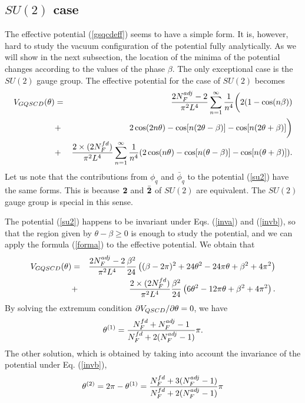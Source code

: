 \documentclass[a4paper,12pt]{article}
\begin{document}
\subsection{$SU(2)$ case}
The effective potential (\ref{gsqcdeff}) seems to have a simple form.
It is, however, hard to study the vacuum configuration of the
potential fully analytically.
As we will show in the next subsection, the location 
of the minima of the potential changes 
according to the values of the phase $\beta$. 
The only exceptional case is the $SU(2)$ gauge group.
The effective potential for the case of $SU(2)$ becomes
\begin{eqnarray}
V_{GQSCD}(\theta)&=&
{{2N_F^{adj}-2}\over {\pi^2 L^4}}\sum_{n=1}^{\infty}{1\over n^4}
\biggl(2(1-\cos(n\beta))\nonumber\\
&+&2\cos(2n\theta)-\cos[n(2\theta-\beta)]
-\cos[n(2\theta+\beta)]\biggr)\nonumber\\
&+&{{2\times (2N_F^{fd})}\over{\pi^2 L^4}}\sum_{n=1}^{\infty}{1\over n^4}
(2\cos(n\theta)-\cos[n(\theta-\beta)]-\cos[n(\theta+\beta)]).
\label{su2}
\end{eqnarray}
Let us note that the contributions from $\phi_q$ and ${\bar\phi}_q$ 
to the potential (\ref{su2}) have the same forms. This is because
${\bf 2}$ and ${\bar {\bf 2}}$ of $SU(2)$ are equivalent.
The $SU(2)$ gauge group is special in this sense.
\par
The potential (\ref{su2}) happens to be invariant under 
Eqs. (\ref{inva}) and (\ref{invb}), so that
the region given by $\theta-\beta \geq 0$ is enough to study the 
potential, and we can apply the formula (\ref{forma}) to the effective
potential. We obtain that
\begin{eqnarray}
V_{GQSCD}(\theta)&=&
{{2N_F^{adj}-2}\over {\pi^2 L^4}}{{\beta^2}\over {24}}
\left((\beta-2\pi)^2+24\theta^2
-24\pi\theta+\beta^2+4\pi^2\right)\nonumber\\
&+&{{2\times (2N_F^{fd})}\over{\pi^2 L^4}}{{\beta^2}\over{24}}
\left(6\theta^2-12\pi\theta+\beta^2+4\pi^2\right).
\end{eqnarray}
By solving the extremum condition $\partial V_{QSCD}/\partial\theta=0$, we have
\begin{equation}
\theta^{(1)}={{N_F^{fd}+N_F^{adj}-1}\over{N_F^{fd}+2(N_F^{adj}-1)}}\pi.
\label{su2sol}
\end{equation}
The other solution, which is 
obtained by taking into account the invariance of the potential 
under Eq. (\ref{invb}), 
\begin{equation}
\theta^{(2)}=2\pi-\theta^{(1)}
={{N_F^{fd}+3(N_F^{adj}-1)}\over{N_F^{fd}+2(N_F^{adj}-1)}}\pi
\end{equation}
\end{document}
